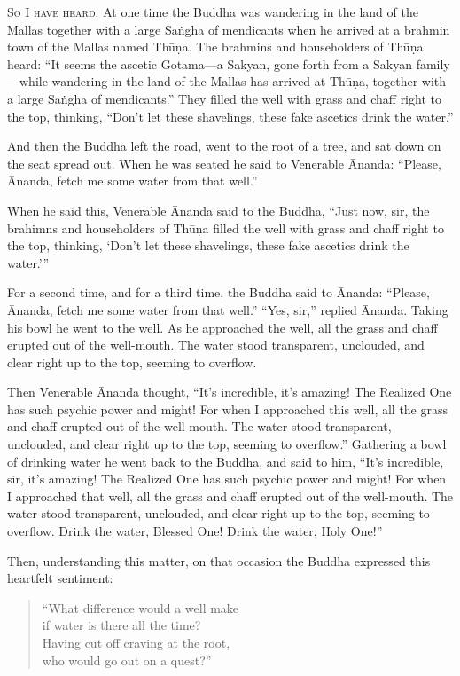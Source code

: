\documentclass[12pt,openany]{book}%
\newcommand*{\scevam}[1]{\textsc{#1}}
\begin{document}
\scevam{So I have heard. }At one time the Buddha was wandering in the land of the Mallas together with a large \textsanskrit{Saṅgha} of mendicants when he arrived at a brahmin town of the Mallas named \textsanskrit{Thūṇa}. The brahmins and householders of \textsanskrit{Thūṇa} heard: “It seems the ascetic Gotama—a Sakyan, gone forth from a Sakyan family—while wandering in the land of the Mallas has arrived at \textsanskrit{Thūṇa}, together with a large \textsanskrit{Saṅgha} of mendicants.” They filled the well with grass and chaff right to the top, thinking, “Don’t let these shavelings, these fake ascetics drink the water.” 

And then the Buddha left the road, went to the root of a tree, and sat down on the seat spread out. When he was seated he said to Venerable Ānanda: “Please, Ānanda, fetch me some water from that well.” 

When he said this, Venerable Ānanda said to the Buddha, “Just now, sir, the brahimns and householders of \textsanskrit{Thūṇa} filled the well with grass and chaff right to the top, thinking, ‘Don’t let these shavelings, these fake ascetics drink the water.’” 

For a second time, and for a third time, the Buddha said to Ānanda: “Please, Ānanda, fetch me some water from that well.” “Yes, sir,” replied Ānanda. Taking his bowl he went to the well. As he approached the well, all the grass and chaff erupted out of the well-mouth. The water stood transparent, unclouded, and clear right up to the top, seeming to overflow. 

Then Venerable Ānanda thought, “It’s incredible, it’s amazing! The Realized One has such psychic power and might! For when I approached this well, all the grass and chaff erupted out of the well-mouth. The water stood transparent, unclouded, and clear right up to the top, seeming to overflow.” Gathering a bowl of drinking water he went back to the Buddha, and said to him, “It’s incredible, sir, it’s amazing! The Realized One has such psychic power and might! For when I approached that well, all the grass and chaff erupted out of the well-mouth. The water stood transparent, unclouded, and clear right up to the top, seeming to overflow. Drink the water, Blessed One! Drink the water, Holy One!” 

Then, understanding this matter, on that occasion the Buddha expressed this heartfelt sentiment: 

\begin{verse}%
“What difference would a well make \\
if water is there all the time? \\
Having cut off craving at the root, \\
who would go out on a quest?” 

%
\end{verse}
\end{document}
